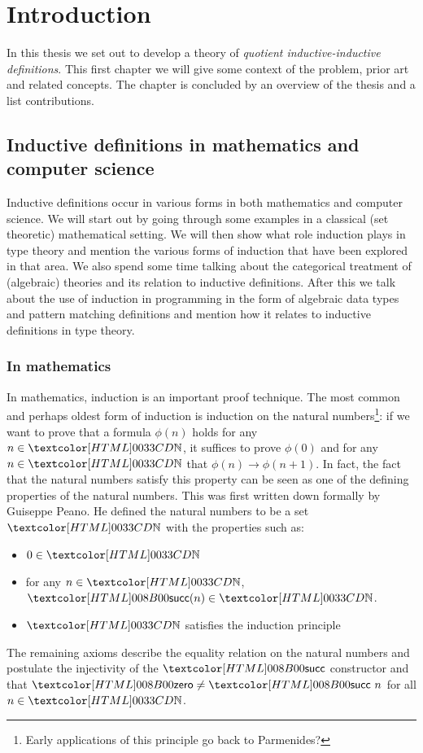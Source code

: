 \chapter{Introduction}
\label{intro}

In this thesis we set out to develop a theory of \emph{quotient
  inductive-inductive definitions}. This first chapter we will give
some context of the problem, prior art and related concepts. The
chapter is concluded by an overview of the thesis and a list
contributions.

\section{Inductive definitions in mathematics and computer science}

Inductive definitions occur in various forms in both mathematics and
computer science. We will start out by going through some examples in
a classical (set theoretic) mathematical setting. We will then show
what role induction plays in type theory and mention the various forms
of induction that have been explored in that area. We also spend some
time talking about the categorical treatment of (algebraic) theories
and its relation to inductive definitions. After this we talk about
the use of induction in programming in the form of algebraic data
types and pattern matching definitions and mention how it relates to
inductive definitions in type theory.

\subsection{In mathematics}
In mathematics, induction is an important proof technique. The most
common and perhaps oldest form of induction is induction on the
natural numbers\footnote{Early applications of this principle go back
  to Parmenides?}: if we want to prove that a formula $\phi(n)$ holds
for any $n \in \natty$, it suffices to prove $\phi(0)$ and for any
$n \in \natty$ that $\phi(n) \to \phi(n+1)$. In fact, the fact that
the natural numbers satisfy this property can be seen as one of the
defining properties of the natural numbers. This was first written
down formally by Guiseppe Peano. He defined the natural numbers to be
a set $\natty$ with the properties such as:
\begin{itemize}
\item $0 \in \natty$
\item for any $n \in \natty$, $\natsucc(n) \in \natty$.
\item $\natty$ satisfies the induction principle
\end{itemize}
The remaining axioms describe the equality relation on the natural
numbers and postulate the injectivity of the $\natsucc$ constructor
and that $\natzero \neq \natsucc\ n$ for all $n \in \natty$.

